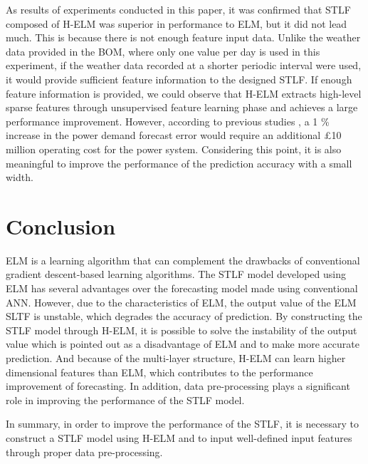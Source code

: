 \documentclass[runningheads,a4paper]{llncs}
\begin{document}
As results of experiments conducted in this paper, it was confirmed that STLF composed of H-ELM was superior in performance to ELM, but it did not lead much. This is because there is not enough feature input data. Unlike the weather data provided in the BOM, where only one value per day is used in this experiment, if the weather data recorded at a shorter periodic interval were used, it would provide sufficient feature information to the designed STLF. If enough feature information is provided, we could observe that H-ELM extracts high-level sparse features through unsupervised feature learning phase and achieves a large performance improvement. However, according to previous studies \cite{economic_benefit}, a 1 \% increase in the power demand forecast error would require an additional \pounds 10 million operating cost for the power system. Considering this point, it is also meaningful to improve the performance of the prediction accuracy with a small width.


\section{Conclusion}

ELM is a learning algorithm that can complement the drawbacks of conventional gradient descent-based learning algorithms. The STLF model developed using ELM has several advantages over the forecasting model made using conventional ANN. However, due to the characteristics of ELM, the output value of the ELM SLTF is unstable, which degrades the accuracy of prediction. By constructing the STLF model through H-ELM, it is possible to solve the instability of the output value which is pointed out as a disadvantage of ELM and to make more accurate prediction. And because of the multi-layer structure, H-ELM can learn higher dimensional features than ELM, which contributes to the performance improvement of forecasting. In addition, data pre-processing plays a significant role in improving the performance of the STLF model. 

In summary, in order to improve the performance of the STLF, it is necessary to construct a STLF model using H-ELM and to input well-defined input features through proper data pre-processing.
\end{document}
